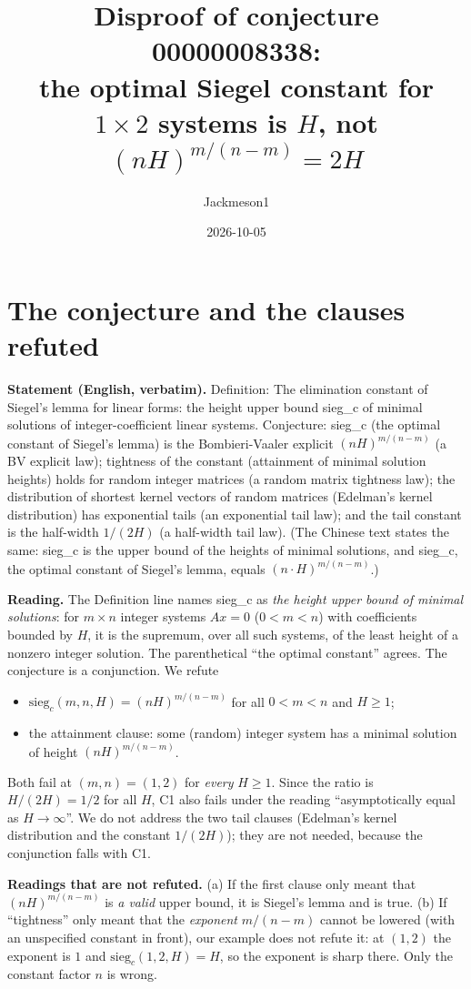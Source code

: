\documentclass[11pt]{article}
\title{Disproof of conjecture 00000008338:\\ the optimal Siegel constant for $1\times 2$ systems is $H$, not $(nH)^{m/(n-m)}=2H$}
\author{Jackmeson1}
\date{2026-10-05}
\theoremstyle{definition}
\begin{document}
\maketitle

\section{The conjecture and the clauses refuted}

\textbf{Statement (English, verbatim).} Definition: The elimination constant of Siegel's lemma
for linear forms: the height upper bound sieg\_c of minimal solutions of integer-coefficient
linear systems. Conjecture: sieg\_c (the optimal constant of Siegel's lemma) is the
Bombieri-Vaaler explicit $(n H)^{m/(n-m)}$ (a BV explicit law); tightness of the constant
(attainment of minimal solution heights) holds for random integer matrices (a random matrix
tightness law); the distribution of shortest kernel vectors of random matrices (Edelman's kernel
distribution) has exponential tails (an exponential tail law); and the tail constant is the
half-width $1/(2H)$ (a half-width tail law). (The Chinese text states the same: sieg\_c is the
upper bound of the heights of minimal solutions, and sieg\_c, the optimal constant of Siegel's
lemma, equals $(n\cdot H)^{m/(n-m)}$.)

\textbf{Reading.} The Definition line names sieg\_c as \emph{the height upper bound of minimal
solutions}: for $m\times n$ integer systems $Ax=0$ ($0<m<n$) with coefficients bounded by $H$,
it is the supremum, over all such systems, of the least height of a nonzero integer solution.
The parenthetical ``the optimal constant'' agrees. The conjecture is a conjunction. We refute
\begin{itemize}
\item[(C1)] $\mathrm{sieg}_c(m,n,H)=(nH)^{m/(n-m)}$ for all $0<m<n$ and $H\ge 1$;
\item[(C2)] the attainment clause: some (random) integer system has a minimal solution of height
$(nH)^{m/(n-m)}$.
\end{itemize}
Both fail at $(m,n)=(1,2)$ for \emph{every} $H\ge 1$. Since the ratio is $H/(2H)=1/2$ for all $H$,
C1 also fails under the reading ``asymptotically equal as $H\to\infty$''. We do not address the
two tail clauses (Edelman's kernel distribution and the constant $1/(2H)$); they are not needed,
because the conjunction falls with C1.

\textbf{Readings that are not refuted.} (a) If the first clause only meant that $(nH)^{m/(n-m)}$
is \emph{a valid} upper bound, it is Siegel's lemma and is true. (b) If ``tightness'' only meant
that the \emph{exponent} $m/(n-m)$ cannot be lowered (with an unspecified constant in front),
our example does not refute it: at $(1,2)$ the exponent is $1$ and $\mathrm{sieg}_c(1,2,H)=H$,
so the exponent is sharp there. Only the constant factor $n$ is wrong.
\end{document}
